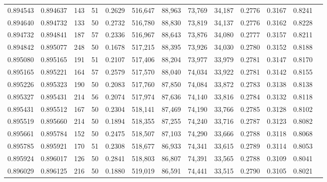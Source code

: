 \begin{tabular}{rrrrrrrrrrrrr}
0.894543 & 0.894637 &   143 &  51 &                                     0.2629 & 516,647 &  88,963 &  73,769 &  34,187 & 0.2776 & 0.3167 & 0.8241 \\
0.894640 & 0.894732 &   133 &  50 &                                     0.2732 & 516,780 &  88,830 &  73,819 &  34,137 & 0.2776 & 0.3162 & 0.8228 \\
0.894732 & 0.894841 &   187 &  57 &                                     0.2336 & 516,967 &  88,643 &  73,876 &  34,080 & 0.2777 & 0.3157 & 0.8211 \\
0.894842 & 0.895077 &   248 &  50 &                                     0.1678 & 517,215 &  88,395 &  73,926 &  34,030 & 0.2780 & 0.3152 & 0.8188 \\
0.895080 & 0.895165 &   191 &  51 &                                     0.2107 & 517,406 &  88,204 &  73,977 &  33,979 & 0.2781 & 0.3147 & 0.8170 \\
0.895165 & 0.895221 &   164 &  57 &                                     0.2579 & 517,570 &  88,040 &  74,034 &  33,922 & 0.2781 & 0.3142 & 0.8155 \\
0.895226 & 0.895323 &   190 &  50 &                                     0.2083 & 517,760 &  87,850 &  74,084 &  33,872 & 0.2783 & 0.3138 & 0.8138 \\
0.895327 & 0.895431 &   214 &  56 &                                     0.2074 & 517,974 &  87,636 &  74,140 &  33,816 & 0.2784 & 0.3132 & 0.8118 \\
0.895431 & 0.895512 &   167 &  50 &                                     0.2304 & 518,141 &  87,469 &  74,190 &  33,766 & 0.2785 & 0.3128 & 0.8102 \\
0.895519 & 0.895660 &   214 &  50 &                                     0.1894 & 518,355 &  87,255 &  74,240 &  33,716 & 0.2787 & 0.3123 & 0.8082 \\
0.895661 & 0.895784 &   152 &  50 &                                     0.2475 & 518,507 &  87,103 &  74,290 &  33,666 & 0.2788 & 0.3118 & 0.8068 \\
0.895785 & 0.895921 &   170 &  51 &                                     0.2308 & 518,677 &  86,933 &  74,341 &  33,615 & 0.2789 & 0.3114 & 0.8053 \\
0.895924 & 0.896017 &   126 &  50 &                                     0.2841 & 518,803 &  86,807 &  74,391 &  33,565 & 0.2788 & 0.3109 & 0.8041 \\
0.896029 & 0.896125 &   216 &  50 &                                     0.1880 & 519,019 &  86,591 &  74,441 &  33,515 & 0.2790 & 0.3105 & 0.8021 \\

\end{tabular}
